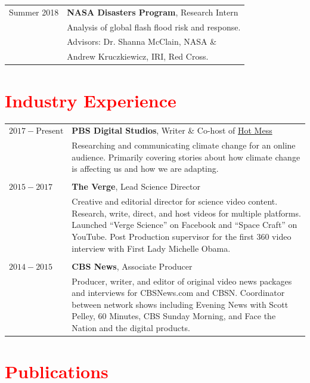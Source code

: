 \documentclass[margin, line]{res}
\begin{document}
\begin{resume}
\begin{tabular}{@{}p{1 in}p{4in}}
Summer 2018 & \textbf{NASA Disasters Program}, Research Intern  \\
& Analysis of global flash flood risk and response.  \\
& \hspace{0.3in} Advisors:  Dr. Shanna McClain, NASA \& \\
& \hspace{0.3in} Andrew Kruczkiewicz, IRI, Red Cross. \\

\end{tabular}

\section{\sc \textcolor{Red}{\large{Industry Experience}}}
\vspace*{0.05in}
\begin{tabular}{@{}p{1 in}p{4in}}
$2017 - \text{Present}$  & \textbf{PBS Digital Studios}, Writer \& Co-host of \href{HM}{Hot Mess}\\
& Researching and communicating climate change for an online audience. Primarily covering stories about how climate change is affecting us and how we are adapting.\\
\\
$2015 - 2017$ & \textbf{The Verge}, Lead Science Director  \\
& Creative and editorial director for science video content. Research, write, direct, and host videos for multiple platforms. Launched “Verge Science” on Facebook and “Space Craft” on YouTube.  Post Production supervisor for the first 360 video interview with First Lady Michelle Obama. \\
\\
$2014 - 2015$ & \textbf{CBS News}, Associate Producer  \\
& Producer, writer, and editor of original video news packages and interviews for CBSNews.com and CBSN. Coordinator between network shows including Evening News with Scott Pelley, 60 Minutes, CBS Sunday Morning, and Face the Nation and the digital products. \\

\end{tabular}



\section{\sc \large{\textcolor{Red}{Publications}}}


\end{resume}
\end{document}
